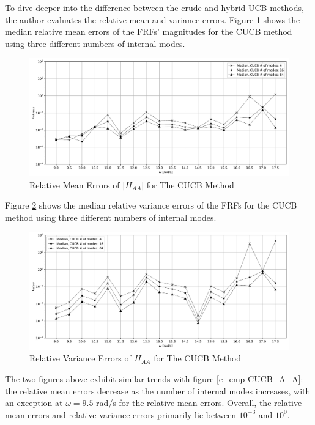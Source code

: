 To dive deeper into the difference between the crude and hybrid UCB methods, the author evaluates the relative mean and variance errors.
Figure \ref{e_mean CUCB_A_A} shows the median relative mean errors of the FRFs' magnitudes for the CUCB method using three different numbers of internal modes.
\begin{figure}[H]
    \centering
    \includegraphics[width=1.0\textwidth]{
        plots/substructuring/plot_4.pdf
    }
    \caption{%
        Relative Mean Errors of $\left|H_{AA}\right|$ for The CUCB Method
    }
    \label{e_mean CUCB_A_A}
\end{figure}
Figure \ref{e_var CUCB_A_A} shows the median relative variance errors of the FRFs for the CUCB method using three different numbers of internal modes.
\begin{figure}[H]
    \centering
    \includegraphics[width=1.0\textwidth]{
        plots/substructuring/plot_5.pdf
    }
    \caption{%
        Relative Variance Errors of $H_{AA}$ for The CUCB Method
    }
    \label{e_var CUCB_A_A}
\end{figure}
The two figures above exhibit similar trends with figure \ref{e_emp CUCB_A_A}: the relative mean errors decrease as the number of internal modes increases, with an exception at $\omega=9.5$ rad/s for the relative mean errors.
Overall, the relative mean errors and relative variance errors primarily lie between $10^{-3}$ and $10^{0}$.

